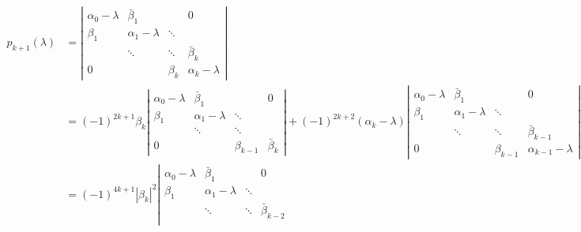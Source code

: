 \documentclass[1pt, a4paper]{article}
\begin{document}
\begin{equation}
    \begin{aligned}
        p_{k+1}(\lambda) &= \left|\begin{matrix}
                    \alpha_0-\lambda & \bar{\beta}_1 & & 0\\
                    \beta_1 & \alpha_1-\lambda & \ddots & \\
                        & \ddots & \ddots & \bar{\beta}_{k}\\
                    0 & & \beta_{k} & \alpha_{k}-\lambda
                  \end{matrix}\right|\\
                &= (-1)^{2k+1}\beta_k\left|\begin{matrix}
                                        \alpha_0-\lambda & \bar{\beta}_1 & & 0\\
                                        \beta_1 & \alpha_1-\lambda & \ddots & \\
                                            & \ddots & \ddots & \\
                                        0 & & \beta_{k-1} & \bar{\beta}_{k}
                                      \end{matrix}\right| + (-1)^{2k+2}(\alpha_k-\lambda)\left|\begin{matrix}
                                                                                \alpha_0-\lambda & \bar{\beta}_1 & & 0\\
                                                                                \beta_1 & \alpha_1-\lambda & \ddots & \\
                                                                                    & \ddots & \ddots & \bar{\beta}_{k-1}\\
                                                                                0 & & \beta_{k-1} & \alpha_{k-1}-\lambda
                                                                              \end{matrix}\right|\\
                &= (-1)^{4k+1}|\beta_k|^2\left|\begin{matrix}
                        \alpha_0-\lambda & \bar{\beta}_1 & & 0\\
                        \beta_1 & \alpha_1-\lambda & \ddots & \\
                            & \ddots & \ddots & \bar{\beta}_{k-2}\\

\end{matrix}
\end{aligned}
\end{equation}
\end{document}
